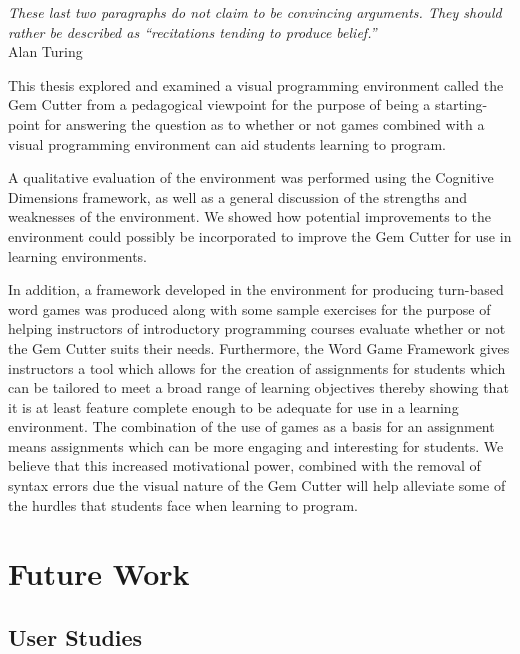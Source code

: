 \label{concl}

\begin{flushright}
\textit{These last two paragraphs do not claim to be convincing arguments. They should rather be described as ``recitations tending to produce belief.''}
\\
Alan Turing \cite{Turing50} \\
\end{flushright}

This thesis explored and examined a visual programming environment called the Gem Cutter from a pedagogical viewpoint for the purpose of being a starting-point for answering the question as to whether or not games combined with a visual programming environment can aid students learning to program.

A qualitative evaluation of the environment was performed using the Cognitive Dimensions framework, as well as a general discussion of the strengths and weaknesses of the environment.  We showed how potential improvements to the environment could possibly be incorporated to improve the Gem Cutter for use in learning environments.  

In addition, a framework developed in the environment for producing turn-based word games was produced along with some sample exercises for the purpose of helping instructors of introductory programming courses evaluate whether or not the Gem Cutter suits their needs.  Furthermore, the Word Game Framework gives instructors a tool which allows for the creation of assignments for students which can be tailored to meet a broad range of learning objectives thereby showing that it is at least feature complete enough to be adequate for use in a learning environment.  The combination of the use of games as a basis for an assignment means assignments which can be more engaging and interesting for students.  We believe that this increased motivational power, combined with the removal of syntax errors due the visual nature of the Gem Cutter will help alleviate some of the hurdles that students face when learning to program.

\section{Future Work}

\subsection{User Studies}

